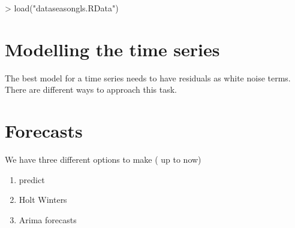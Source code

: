 \documentclass[11pt, a4paper]{article} %
\begin{document}
\begin{Schunk}
\begin{Sinput}
> load("dataseasongls.RData")
\end{Sinput}
\end{Schunk}

\section{Modelling the time series}
The best model for a time series needs to have residuals as white noise terms.
There are different ways to approach this task.
\section{Forecasts}%
We have three different options to make ( up to now)
\begin{enumerate}
\item predict
\item Holt Winters
\item Arima forecasts
\end{enumerate}
\end{document}
